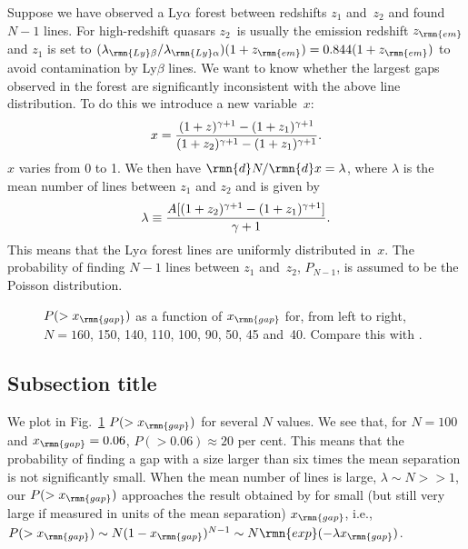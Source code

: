 \documentclass[useAMS,usedcolumn,usegraphicx,usenatbib]{mn2e}
\begin{document}
Suppose we have observed a Ly$\alpha$ forest between redshifts $z_1$
and~$z_2$ and found $N-1$ lines.  For high-redshift quasars $z_2$~is
usually the emission redshift $z_{\rmn{em}}$ and $z_1$ is set to
$(\lambda_{\rmn{Ly}\beta}/\lambda_{\rmn{Ly}\alpha})(1+z_{\rmn{em}})=0.844
(1+z_{\rmn{em}})$ to avoid contamination by Ly$\beta$ lines.  We
want to know whether the largest gaps observed in the forest are
significantly inconsistent with the above line distribution.  To do
this we introduce a new variable~$x$:
%
\begin{equation}
x={(1+z)^{\gamma+1}-(1+z_1)^{\gamma+1} \over
     (1+z_2)^{\gamma+1}-(1+z_1)^{\gamma+1}}.
\end{equation}
%
$x$ varies from 0 to 1.  We then have $\rmn{d}N/\rmn{d}x=\lambda$, where $\lambda$
is the mean number of lines between $z_1$ and $z_2$ and is given by
%
\begin{equation}
\lambda\equiv{A[(1+z_2)^{\gamma+1}-(1+z_1)^{\gamma+1}]\over\gamma+1}.
\end{equation}
%
This means that the Ly$\alpha$ forest lines are uniformly
distributed in~$x$. The probability of finding $N-1$ lines between $z_1$
and~$z_2$, $P_{N-1}$, is assumed to be the Poisson distribution.
%
\newpage
%
\begin{figure}
\vspace{11pc}
\caption{$P(>x_{\rmn{gap}})$ as a function of $x_{\rmn{gap}}$ for,
 from left to right, $N=160$, 150, 140, 110, 100, 90, 50, 45 and~40.
 Compare this with \protect\citet{b15}.}
\label{appenfig}
\end{figure}

\subsection{Subsection title}

We plot in Fig.~\ref{appenfig} $P(>x_{\rmn{gap}})$ for several $N$
values. We see that, for $N=100$ and $x_{\rmn{gap}}=0.06$,
$P(>0.06)\approx20$ per cent.  This means that the probability of
finding a gap with a size larger than six times the mean
separation is not significantly small. When the mean number of
lines is large, $\lambda\sim N>>1$, our $P(>x_{\rmn{gap}})$
approaches the result obtained by \citet[fig. 4]{b22} for small
(but still very large if measured in units of the mean separation)
$x_{\rmn{gap}}$, i.e., $P(>x_{\rmn{gap}})\sim N(1-
x_{\rmn{gap}})^{N-1}\sim N {\rmn{exp}}(-\lambda x_{\rmn{gap}})$.

\bsp

\label{lastpage}
\end{document}
